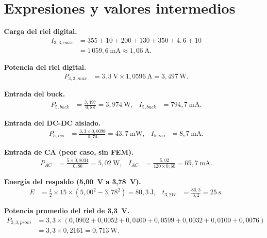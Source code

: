 \documentclass[11pt,a4paper]{article}
\begin{document}
\section{Expresiones y valores intermedios}

\noindent\textbf{Carga del riel digital.}
\begin{align}
I_{3,3,max} &= 355 + 10 + 200 + 130 + 350 + 4{,}6 + 10 \nonumber\\
            &= 1\,059{,}6~\mathrm{mA} \approx 1{,}06~\mathrm{A}.
\end{align}

\noindent\textbf{Potencia del riel digital.}
\begin{align}
P_{3,3,max} &= 3{,}3~\mathrm{V}\times1{,}0596~\mathrm{A} = 3{,}497~\mathrm{W}.
\end{align}

\noindent\textbf{Entrada del buck.}
\begin{align}
P_{5,buck} &= \frac{3{,}497}{0{,}88} = 3{,}974~\mathrm{W},
& I_{5,buck} &= 794{,}7~\mathrm{mA}.
\end{align}

\noindent\textbf{Entrada del DC-DC aislado.}
\begin{align}
P_{5,iso} &= \frac{3{,}3\times0{,}0098}{0{,}74} = 43{,}7~\mathrm{mW},
& I_{5,iso} &= 8{,}7~\mathrm{mA}.
\end{align}

\noindent\textbf{Entrada de CA (peor caso, sin FEM).}
\begin{align}
P_{AC} &= \frac{5\times0{,}8034}{0{,}80} = 5{,}02~\mathrm{W},
& I_{AC} &= \frac{5{,}02}{120\times0{,}60} = 69{,}7~\mathrm{mA}.
\end{align}

\noindent\textbf{Energía del respaldo (5,00~V a 3,78~V).}
\begin{align}
E &= \tfrac{1}{2}\times15\times\left(5{,}00^2-3{,}78^2\right) = 80{,}3~\mathrm{J},
& t_{3,2W} &= \frac{80{,}3}{3{,}2} = 25~\mathrm{s}.
\end{align}

\noindent\textbf{Potencia promedio del riel de 3,3~V.}
\begin{align}
P_{3,3,prom} &= 3{,}3\times(0{,}0902+0{,}0052+0{,}0400+0{,}0599+0{,}0032+0{,}0100+0{,}0076) \nonumber\\
&= 3{,}3\times0{,}2161 = 0{,}713~\mathrm{W}.
\end{align}
\end{document}
